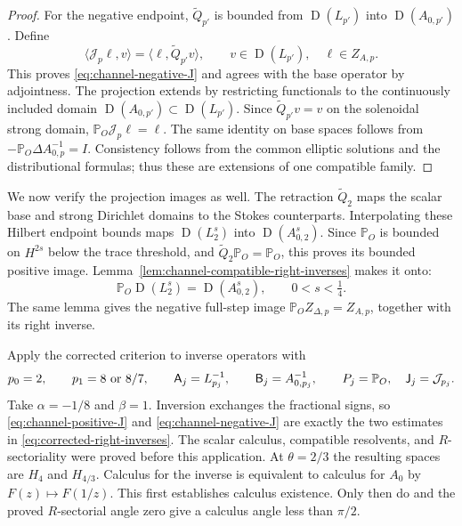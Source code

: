 \documentclass[11pt]{article}
\numberwithin{equation}{section}
\theoremstyle{remark}
\newcommand{\PP}{\mathbb P}
\DeclareMathOperator{\Dom}{D}
\begin{document}
\begin{proof}
For the negative endpoint, $\widetilde Q_{p'}$ is bounded from
$\Dom(L_{p'})$ into $\Dom(A_{0,p'})$. Define
\[
 \langle\mathcal J_p\ell,v\rangle
   =\langle\ell,\widetilde Q_{p'}v\rangle,
 \qquad v\in\Dom(L_{p'}),\quad\ell\in Z_{A,p}.
\]
This proves \eqref{eq:channel-negative-J} and agrees with the base
operator by adjointness. The projection extends by restricting
functionals to the continuously included domain
$\Dom(A_{0,p'})\subset\Dom(L_{p'})$. Since
$\widetilde Q_{p'}v=v$ on the solenoidal strong domain,
$\PP_O\mathcal J_p\ell=\ell$. The same identity on base spaces follows
from $-\PP_O\Delta A_{0,p}^{-1}=I$. Consistency follows from the common
elliptic solutions and the distributional formulas; thus these are
extensions of one compatible family.
\end{proof}

We now verify the projection images as well. The retraction
$\widetilde Q_2$ maps the scalar base and strong Dirichlet domains to
the Stokes counterparts. Interpolating these Hilbert endpoint bounds
maps $\Dom(L_2^s)$ into $\Dom(A_{0,2}^s)$. Since $\PP_O$ is bounded
on $H^{2s}$ below the trace threshold, and
$\widetilde Q_2\PP_O=\PP_O$, this proves its bounded positive image.
Lemma~\ref{lem:channel-compatible-right-inverses} makes it onto:
\[
 \PP_O\Dom(L_2^s)=\Dom(A_{0,2}^s),\qquad 0<s<\tfrac14.
\]
The same lemma gives the negative full-step image
$\PP_OZ_{\Delta,p}=Z_{A,p}$, together with its right inverse.

Apply the corrected criterion to inverse operators with
\[
 p_0=2,\qquad p_1=8\ \hbox{or}\ 8/7,\qquad
 \mathsf A_j=L_{p_j}^{-1},\qquad
 \mathsf B_j=A_{0,p_j}^{-1},\qquad
 P_j=\PP_O,\quad\mathsf J_j=\mathcal J_{p_j}.
\]
Take $\alpha=-1/8$ and $\beta=1$. Inversion exchanges the fractional
signs, so \eqref{eq:channel-positive-J} and
\eqref{eq:channel-negative-J} are exactly the two estimates in
\eqref{eq:corrected-right-inverses}. The scalar calculus, compatible
resolvents, and $R$-sectoriality were proved before this application.
At $\theta=2/3$ the resulting spaces are $H_4$ and $H_{4/3}$.
Calculus for the inverse is equivalent to calculus for $A_0$ by
$F(z)\mapsto F(1/z)$. This first establishes calculus existence.
Only then do \cite[Theorem 4.1, Corollary 4.4]{KKW} and the proved
$R$-sectorial angle zero give a calculus angle less than $\pi/2$.
\end{document}
